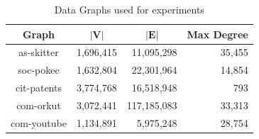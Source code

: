 \begin{table}[tbp]
    \centering
    \caption{Data Graphs used for experiments}
    \begin{tabular}{@{}crrr@{}}
        \hline
        \multicolumn{1}{c}{\textbf{Graph}} & \multicolumn{1}{c}{$|\textbf{V}|$} & \multicolumn{1}{c}{$|\textbf{E}|$} & \multicolumn{1}{c}{\textbf{Max Degree}} \\ \hline
        as-skitter                         & 1,696,415                          & 11,095,298                         & 35,455                                  \\
        soc-pokec                          & 1,632,804                          & 22,301,964                         & 14,854                                  \\
        cit-patents                        & 3,774,768                          & 16,518,948                         & 793                                     \\
        com-orkut                          & 3,072,441                          & 117,185,083                        & 33,313                                  \\
        com-youtube                        & 1,134,891                          & 5,975,248                          & 28,754                                  \\
        \hline
    \end{tabular}%
    \label{tab:graphs}
\end{table}

